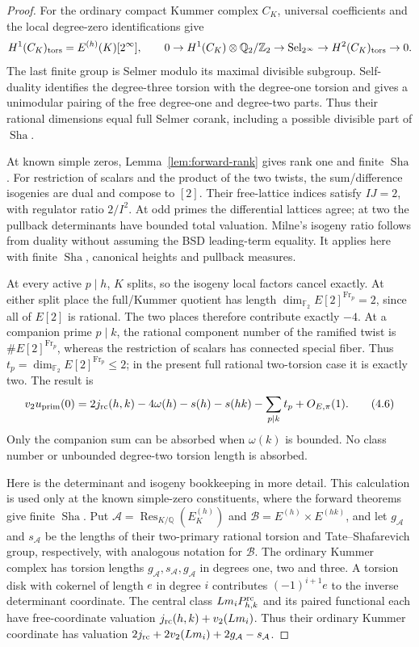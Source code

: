 \documentclass[11pt]{article}
\theoremstyle{definition}
\theoremstyle{remark}
\newcommand{\Q}{\mathbb Q}
\newcommand{\Z}{\mathbb Z}
\newcommand{\F}{\mathbb F}
\newcommand{\Sel}{\operatorname{Sel}}
\newcommand{\Sha}{\operatorname{Sha}}
\begin{document}
\begin{proof}\leavevmode
For the ordinary compact Kummer complex $C_K$, universal coefficients
and the local degree-zero identifications give
\[
 H^1(C_K)_{\rm tors}=E^{(h)}(K)[2^\infty],\qquad
 0\to H^1(C_K)\otimes\Q_2/\Z_2\to\Sel_{2^\infty}
       \to H^2(C_K)_{\rm tors}\to0.
\]
The last finite group is Selmer modulo its maximal divisible subgroup.
Self-duality identifies the degree-three torsion with the degree-one
torsion and gives a unimodular pairing of the free degree-one and
degree-two parts. Thus their rational dimensions equal full Selmer
corank, including a possible divisible part of $\Sha$.

At known simple zeros, Lemma~\ref{lem:forward-rank}
gives rank one and finite $\Sha$.
For restriction of scalars and the product of the two twists, the
sum/difference isogenies are dual and compose to $[2]$.
Their free-lattice indices satisfy $IJ=2$, with regulator ratio
$2/I^2$. At odd primes the differential lattices agree; at two the
pullback determinants have bounded total valuation.
Milne's isogeny ratio \cite[proof of I.7.3, (7.3.1)]{milne} follows
from duality without assuming the BSD leading-term equality.
It applies here with finite $\Sha$, canonical heights and pullback
measures.

At every active $p\mid h$, $K$ splits, so the isogeny local factors
cancel exactly. At either split place the full/Kummer quotient
has length
$\dim_{\F_2}E[2]^{\operatorname{Fr}_p}=2$, since all of $E[2]$
is rational. The two places therefore contribute exactly $-4$. At a companion prime $p\mid k$, the rational component number
of the ramified twist is $\#E[2]^{\operatorname{Fr}_p}$, whereas
the restriction of scalars has connected special fiber.
Thus $t_p=\dim_{\F_2}E[2]^{\operatorname{Fr}_p}\le2$;
in the present full rational two-torsion case it is exactly two.
The result is
\[
 v_2u_{\rm prim}(0)
 =2j_{\rm rc}(h,k)-4\omega(h)-s(h)-s(hk)
                    -\sum_{p\mid k}t_p+O_{E,\pi}(1).             \tag{4.6}
\]
Only the companion sum can be absorbed when $\omega(k)$ is bounded.
No class number or unbounded degree-two torsion length is absorbed.

Here is the determinant and isogeny bookkeeping in more detail. This
calculation is used only at the known simple-zero constituents, where
the forward theorems give finite $\Sha$. Put
$\mathcal A=\operatorname{Res}_{K/\Q}(E^{(h)}_K)$ and
$\mathcal B=E^{(h)}\times E^{(hk)}$, and let $g_{\mathcal A}$ and
$s_{\mathcal A}$ be the lengths of their two-primary rational torsion
and Tate--Shafarevich group, respectively, with analogous notation
for $\mathcal B$. The ordinary Kummer complex has torsion lengths
$g_{\mathcal A},s_{\mathcal A},g_{\mathcal A}$ in degrees one, two
and three. A torsion disk with cokernel of length $e$ in degree $i$
contributes $(-1)^{i+1}e$ to the inverse determinant coordinate.
The central class $Lm_iP_{h,k}^{\rm rc}$ and its paired functional
each have free-coordinate valuation $j_{\rm rc}(h,k)+v_2(Lm_i)$.
Thus their ordinary Kummer coordinate has valuation
$2j_{\rm rc}+2v_2(Lm_i)+2g_{\mathcal A}-s_{\mathcal A}$.


\end{proof}
\end{document}
